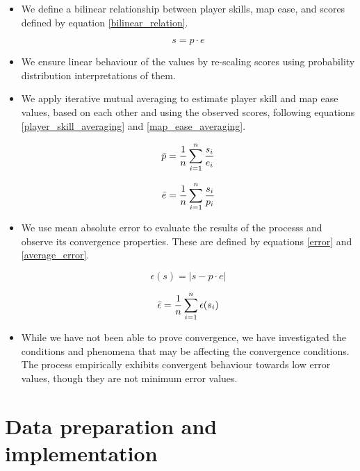 \documentclass[12pt,a4paper]{article}
\begin{document}
\begin{itemize}

\item We define a bilinear relationship between player skills, map ease, and scores defined by equation \ref{bilinear_relation}.

\begin{equation*}
s = p \cdot e
\end{equation*}

\item We ensure linear behaviour of the values by re-scaling scores using probability distribution interpretations of them.

\item We apply iterative mutual averaging to estimate player skill and map ease values, based on each other and using the observed scores, following equations \ref{player_skill_averaging} and \ref{map_ease_averaging}.

\begin{equation*}
\bar{p}  = {{1} \over {n}} \sum\limits_{i = 1}^{n} {{s_i} \over {e_i}}
\end{equation*}

\begin{equation*}
\bar{e}  = {{1} \over {n}} \sum\limits_{i = 1}^{n} {{s_i} \over {p_i}}
\end{equation*}

\item We use mean absolute error to evaluate the results of the processs and observe its convergence properties. These are defined by equations \ref{error} and \ref{average_error}.

\begin{equation*}
\epsilon(s) = |s -  p \cdot e|
\end{equation*}

\begin{equation*}
\bar{\epsilon} = {{1} \over {n}} \sum\limits_{i=1}^{n} \epsilon(s_i)
\end{equation*}

\item While we have not been able to prove convergence, we have investigated the conditions and phenomena that may be affecting the convergence conditions. The process empirically exhibits convergent behaviour towards low error values, though they are not minimum error values.

\end{itemize}

\section{Data preparation and implementation}
\label{data_preparation_implementation}
\end{document}
